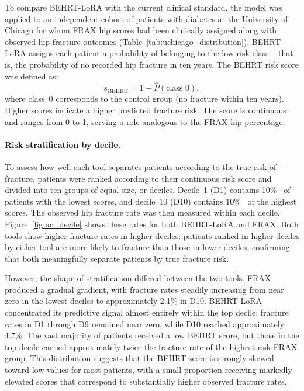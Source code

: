 \documentclass[12pt]{article}
\begin{document}
To compare BEHRT-LoRA with the current clinical standard, the model was applied to an independent cohort of patients with diabetes at the University of Chicago for whom FRAX hip scores had been clinically assigned along with observed hip fracture outcomes (Table~\ref{tab:uchicago_distribution}). BEHRT-LoRA assigns each patient a probability of belonging to the low-risk class -- that is, the probability of no recorded hip fracture in ten years. The BEHRT risk score was defined as:
\begin{equation}
s_{\text{BEHRT}} = 1 - \hat{P}(\text{class 0}),
\label{eq:behrt-score}
\end{equation}
where class~0 corresponds to the control group (no fracture within ten years). Higher scores indicate a higher predicted fracture risk. The score is continuous and ranges from 0 to 1, serving a role analogous to the FRAX hip percentage.

\paragraph{Risk stratification by decile.}
To assess how well each tool separates patients according to the true risk of fracture, patients were ranked according to their continuous risk score and divided into ten groups of equal size, or deciles. Decile~1 (D1) contains 10\% \ of patients with the lowest scores, and decile~10 (D10) contains 10\% \ of the highest scores. The observed hip fracture rate was then measured within each decile. Figure~\ref{fig:uc_decile} shows these rates for both BEHRT-LoRA and FRAX. Both tools show higher fracture rates in higher deciles: patients ranked in higher deciles by either tool are more likely to fracture than those in lower deciles, confirming that both meaningfully separate patients by true fracture risk.

However, the shape of stratification differed between the two tools. FRAX produced a gradual gradient, with fracture rates steadily increasing from near zero in the lowest deciles to approximately 2.1\% in D10. BEHRT-LoRA concentrated its predictive signal almost entirely within the top decile: fracture rates in D1 through D9 remained near zero, while D10 reached approximately 4.7\%. The vast majority of patients received a low BEHRT score, but those in the top decile carried approximately twice the fracture rate of the highest-risk FRAX group. This distribution suggests that the BEHRT score is strongly skewed toward low values for most patients, with a small proportion receiving markedly elevated scores that correspond to substantially higher observed fracture rates.
\end{document}
